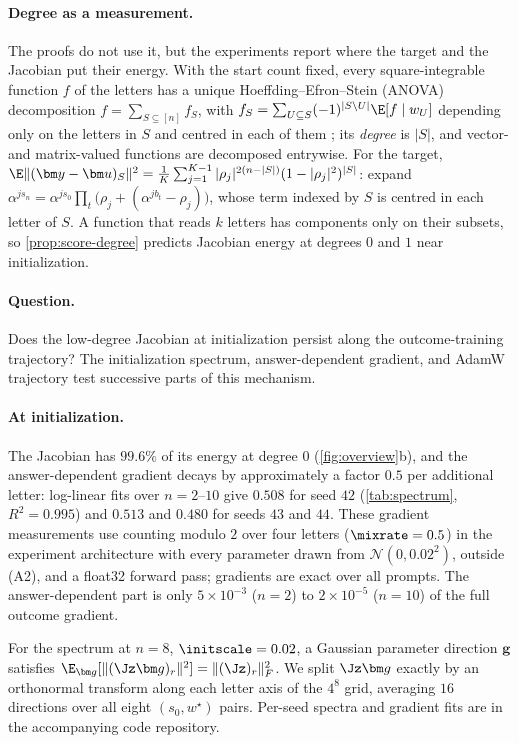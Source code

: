 \paragraph{Degree as a measurement.} The proofs do not use it, but the experiments report where the target and the Jacobian put their
energy. With the start count fixed, every square-integrable function $f$ of the letters has a unique Hoeffding--Efron--Stein (ANOVA)
decomposition $f=\sum_{S\subseteq[n]}f_S$, with $f_S=\sum_{U\subseteq S}(-1)^{|S\setminus U|}\E[f\mid w_U]$ depending only on the letters in $S$ and centred in each
of them \citep{hoeffding1948class,efron1981jackknife,odonnell2014analysis}; its \emph{degree} is $|S|$, and vector- and matrix-valued functions are
decomposed entrywise. For the target, $\E\|(\bm y-\bm u)_S\|^2=\frac{1}{K}\sum_{j=1}^{K-1}|\rho_j|^{2(n-|S|)}(1-|\rho_j|^2)^{|S|}$: expand
$\alpha^{js_n}=\alpha^{js_0}\prod_t\bigl(\rho_j+(\alpha^{jb_t}-\rho_j)\bigr)$, whose term indexed by $S$ is centred in each letter of $S$. A function that reads $k$ letters
has components only on their subsets, so \cref{prop:score-degree} predicts Jacobian energy at degrees $0$ and $1$ near initialization.

\paragraph{Question.} Does the low-degree Jacobian at initialization persist along the outcome-training trajectory?
The initialization spectrum, answer-dependent gradient, and AdamW trajectory test successive parts of this mechanism.

\paragraph{At initialization.} The Jacobian has $99.6\%$ of its energy at degree $0$ (\cref{fig:overview}b), and the answer-dependent
gradient decays by approximately a factor $0.5$ per additional letter: log-linear fits over $n=2$--$10$ give $0.508$ for seed $42$
(\cref{tab:spectrum}, $R^2=0.995$) and $0.513$ and $0.480$ for seeds $43$ and $44$. These gradient measurements use
counting modulo $2$ over four letters ($\mixrate=0.5$) in the experiment architecture with every parameter drawn from
$\mathcal N(0,0.02^2)$, outside (A2), and a float32 forward pass; gradients are exact over all prompts. The answer-dependent part is only
$5\times10^{-3}$ ($n=2$) to $2\times10^{-5}$ ($n=10$) of the full outcome gradient.

For the spectrum at $n=8$, $\initscale=0.02$, a Gaussian parameter direction $\bm g$ satisfies
$\E_{\bm g}[\|(\Jz\bm g)_r\|^2]=\|(\Jz)_r\|_F^2$.
We split $\Jz\bm g$ exactly by an orthonormal transform along each letter axis of the $4^8$ grid,
averaging $16$ directions over all eight $(s_0,w^\star)$ pairs. Per-seed spectra and gradient fits are in the accompanying code repository.

